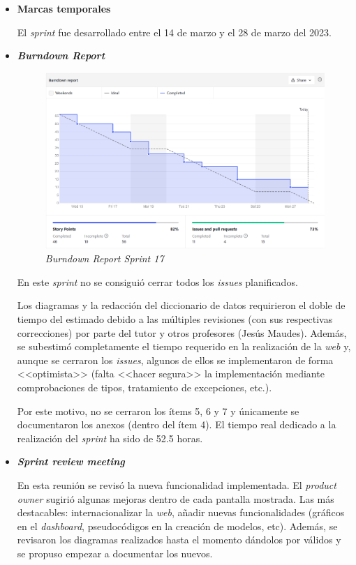 \begin{itemize}
\begin{enumerate}
	\end{enumerate}
	\item \textbf{Marcas temporales}
	
	El \textit{sprint} fue desarrollado entre el 14 de marzo y el 28 de marzo del 2023.
	
	\item \textbf{\textit{Burndown Report}}
	
	\begin{figure}[h]
		\caption{\textit{Burndown Report Sprint 17}}
		\centering
		\includegraphics[width=\textwidth]{../img/anexos/bdr/s17_bdr}
	\end{figure}
	
	En este \textit{sprint} no se consiguió cerrar todos los \textit{issues} planificados.
	
	Los diagramas y la redacción del diccionario de datos requirieron el doble de tiempo del estimado debido a las múltiples revisiones (con sus respectivas correcciones) por parte del tutor y otros profesores (Jesús Maudes).  Además, se subestimó completamente el tiempo requerido en la realización de la \textit{web} y, aunque se cerraron los \textit{issues}, algunos de ellos se implementaron de forma <<optimista>> (falta <<hacer segura>> la implementación mediante comprobaciones de tipos, tratamiento de excepciones, etc.).
	
	Por este motivo, no se cerraron los ítems 5, 6 y 7 y únicamente se documentaron los anexos (dentro del ítem 4). El tiempo real dedicado a la realización del \textit{sprint} ha sido de 52.5 horas.
	
	\item \textbf{\textit{Sprint review meeting}}
	
	En esta reunión se revisó la nueva funcionalidad implementada. El \textit{product owner} sugirió algunas mejoras dentro de cada pantalla mostrada. Las más destacables: internacionalizar la \textit{web}, añadir nuevas funcionalidades (gráficos en el \textit{dashboard}, pseudocódigos en la creación de modelos, etc). Además, se revisaron los diagramas realizados hasta el momento dándolos por válidos y se propuso empezar a documentar los nuevos.
	
\end{itemize}



